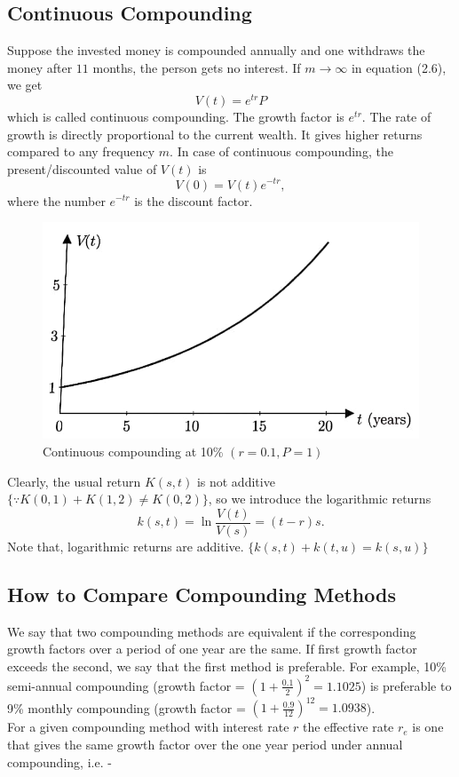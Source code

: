 \subsection{Continuous Compounding}
Suppose the invested money is compounded annually and one withdraws the money after $11$ months, the person gets no interest. If $m \to \infty$ in equation (2.6), we get
\begin{equation}
    V(t)=e^{tr}P
\end{equation}
which is called continuous compounding. The growth factor is $e^{tr}$. The rate of growth is directly proportional to the current wealth. It gives higher returns compared to any frequency $m$.
In case of continuous compounding, the present/discounted value of $V(t)$ is
\begin{equation}
    V(0)=V(t) e^{-tr},
\end{equation}
where the number $e^{-tr}$ is the discount factor.

\begin{figure}[htp]
    \centering
    \includegraphics[width=15cm]{3.jpg}
    \caption{Continuous compounding at 10\% $(r=0.1,P=1)$}
    \label{fig:CC}
\end{figure}

Clearly, the usual return $K(s,t)$ is not additive $\{\because K(0,1)+K(1,2)\neq K(0,2)\}$, so we introduce the logarithmic returns \-
\begin{equation} 
k(s,t)=\ln \frac{V(t)}{V(s)} = (t-r)s.
\end{equation}
Note that, logarithmic returns are additive. $\{k(s,t)+k(t,u)=k(s,u)\}$
\subsection{How to Compare Compounding Methods}
We say that two compounding methods are equivalent if the corresponding growth factors over a period of one year are the same. If first growth factor exceeds the second, we say that the first method is preferable. For example, 10\% semi-annual compounding (growth factor = $(1+\frac{0.1}{2})^{2} =1.1025$) is preferable to 9\% monthly compounding (growth factor = $(1+\frac{0.9}{12})^{12} =1.0938$).
\\For a given compounding method with interest rate $r$ the effective rate $r_{e}$ is one that gives the same growth factor over the one year period under annual compounding, i.e. -

